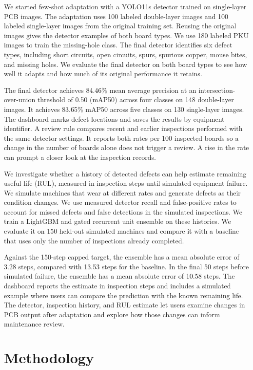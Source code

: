 \documentclass[conference]{IEEEtran}
\begin{document}
We started few-shot adaptation with a YOLO11s detector trained on single-layer PCB images. The adaptation uses 100 labeled double-layer images and 100 labeled single-layer images from the original training set. Reusing the original images gives the detector examples of both board types. We use 180 labeled PKU images to train the missing-hole class. The final detector identifies six defect types, including short circuits, open circuits, spurs, spurious copper, mouse bites, and missing holes. We evaluate the final detector on both board types to see how well it adapts and how much of its original performance it retains.

The final detector achieves 84.46\% mean average precision at an intersection-over-union threshold of 0.50 (mAP50) across four classes on 148 double-layer images. It achieves 83.65\% mAP50 across five classes on 130 single-layer images. The dashboard marks defect locations and saves the results by equipment identifier. A review rule compares recent and earlier inspections performed with the same detector settings. It reports both rates per 100 inspected boards so a change in the number of boards alone does not trigger a review. A rise in the rate can prompt a closer look at the inspection records.

We investigate whether a history of detected defects can help estimate remaining useful life (RUL), measured in inspection steps until simulated equipment failure. We simulate machines that wear at different rates and generate defects as their condition changes. We use measured detector recall and false-positive rates to account for missed defects and false detections in the simulated inspections. We train a LightGBM and gated recurrent unit ensemble on these histories. We evaluate it on 150 held-out simulated machines and compare it with a baseline that uses only the number of inspections already completed.

Against the 150-step capped target, the ensemble has a mean absolute error of 3.28 steps, compared with 13.53 steps for the baseline. In the final 50 steps before simulated failure, the ensemble has a mean absolute error of 10.58 steps. The dashboard reports the estimate in inspection steps and includes a simulated example where users can compare the prediction with the known remaining life. The detector, inspection history, and RUL estimate let users examine changes in PCB output after adaptation and explore how those changes can inform maintenance review.

\section{Methodology}
\end{document}
